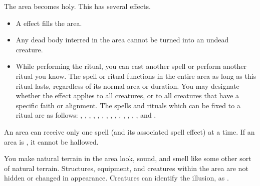 \spellline
\spelleffect The area becomes holy. This has several effects.
\begin{itemize}
    \item A  effect fills the area.
    \item Any dead body interred in the area cannot be turned into an undead creature.
    \item While performing the ritual, you can cast another spell or perform another ritual you know. The spell or ritual functions in the entire area as long as this ritual lasts, regardless of its normal area or duration. You may designate whether the effect applies to all creatures, or to all creatures that have a specific faith or alignment. The spells and rituals which can be fixed to a  ritual are as follows: , , , , , , , , , , , , , , and .
\end{itemize}
\spellnotes An area can receive only one  spell (and its associated spell effect) at a time. If an area is , it cannot be hallowed.

\spelleffect You make natural terrain in the area look, sound, and smell like some other sort of natural terrain. Structures, equipment, and creatures within the area are not hidden or changed in appearance.
\spellnotes Creatures can identify the illusion, as .


